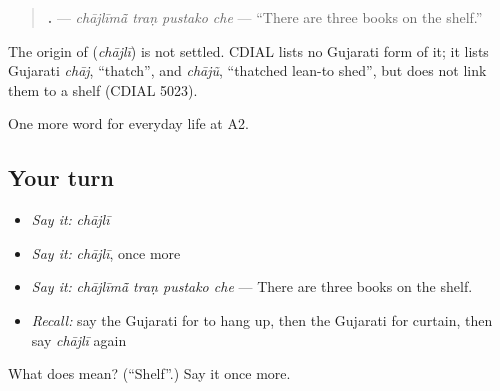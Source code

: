 \begin{quote}
\textbf{   .} — \emph{chājlīmā̃ traṇ pustako che} — \textquotedblleft{}There are three books on the shelf.\textquotedblright{}
\end{quote}

\begin{cousinweb}
The origin of \textbf{} (\emph{chājlī}) is not settled. CDIAL lists no Gujarati form of it; it lists Gujarati \emph{chāj}, \textquotedblleft{}thatch\textquotedblright{}, and \emph{chājũ}, \textquotedblleft{}thatched lean-to shed\textquotedblright{}, but does not link them to a shelf (CDIAL 5023).
\end{cousinweb}

\begin{grammarlens}[title={What you've built}]
One more word for everyday life at A2.
\end{grammarlens}

\subsection*{Your turn}
\begin{itemize}
\raggedright
  \item \emph{Say it:} \emph{chājlī}
  \item \emph{Say it:} \emph{chājlī}, once more
  \item \emph{Say it:} \emph{chājlīmā̃ traṇ pustako che} — There are three books on the shelf.
  \item \emph{Recall:} say the Gujarati for to hang up, then the Gujarati for curtain, then say \emph{chājlī} again
\end{itemize}

\begin{tcolorbox}[breakable,colback=teal!4,colframe=teal!35!black,title={Before you move on}]
What does  mean? (\textquotedblleft{}Shelf\textquotedblright{}.) Say it once more.
\end{tcolorbox}

